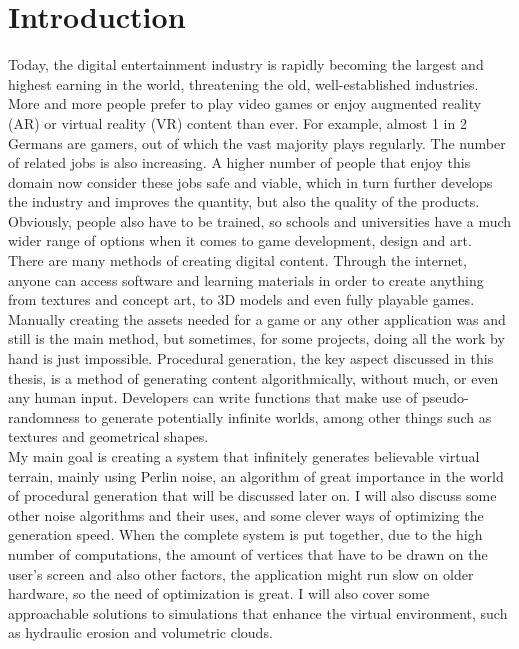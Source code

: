 \chapter*{Introduction}

\pagestyle{fancy}



\label{introduction}

Today, the digital entertainment industry is rapidly becoming the largest and highest earning in the world, threatening the old, well-established industries. More and more people prefer to play video games or enjoy augmented reality (AR) or virtual reality (VR) content than ever. For example, almost 1 in 2 Germans are gamers, out of which the vast majority plays regularly\cite{germans}. The number of related jobs is also increasing. A higher number of people that enjoy this domain now consider these jobs safe and viable, which in turn further develops the industry and improves the quantity, but also the quality of the products. Obviously, people also have to be trained, so schools and universities have a much wider range of options when it comes to game development, design and art.\\

There are many methods of creating digital content. Through the internet, anyone can access software and learning materials in order to create anything from textures and concept art, to 3D models and even fully playable games. Manually creating the assets needed for a game or any other application was and still is the main method, but sometimes, for some projects, doing all the work by hand is just impossible. Procedural generation, the key aspect discussed in this thesis, is a method of generating content algorithmically, without much, or even any human input. Developers can write functions that make use of pseudo-randomness to generate potentially infinite worlds, among other things such as textures and geometrical shapes\cite{procgenwiki}.\\

My main goal is creating a system that infinitely generates believable virtual terrain, mainly using Perlin noise, an algorithm of great importance in the world of procedural generation that will be discussed later on. I will also discuss some other noise algorithms and their uses, and some clever ways of optimizing the generation speed. When the complete system is put together, due to the high number of computations, the amount of vertices that have to be drawn on the user's screen and also other factors, the application might run slow on older hardware, so the need of optimization is great. I will also cover some approachable solutions to simulations that enhance the virtual environment, such as hydraulic erosion and volumetric clouds.